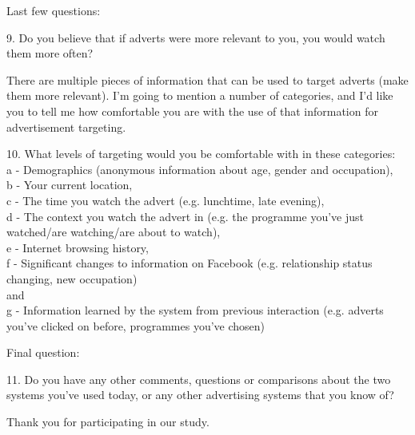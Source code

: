 	Last few questions:

	9. Do you believe that if adverts were more relevant to you, you would watch them more often?

	There are multiple pieces of information that can be used to target adverts (make them more relevant). I'm going to mention a number of categories, and I'd like you to tell me how comfortable you are with the use of that information for advertisement targeting.

	10. What levels of targeting would you be comfortable with in these categories:\\
	a - Demographics (anonymous information about age, gender and occupation),\\
	b - Your current location,\\
	c - The time you watch the advert (e.g. lunchtime, late evening),\\
	d - The context you watch the advert in (e.g. the programme you’ve just watched/are watching/are about to watch),\\
	e - Internet browsing history,\\
	f - Significant changes to information on Facebook (e.g. relationship status changing, new occupation)\\
	and\\
	g - Information learned by the system from previous interaction (e.g. adverts you've clicked on before, programmes you've chosen)

	Final question:

	11. Do you have any other comments, questions or comparisons about the two systems you've used today, or any other advertising systems that you know of?

	Thank you for participating in our study.
